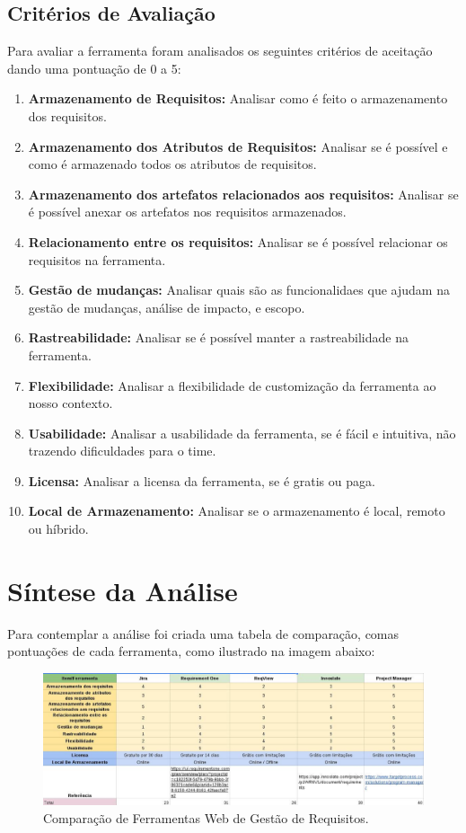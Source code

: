 \subsection{Critérios de Avaliação}
  Para avaliar a ferramenta foram analisados os seguintes critérios de aceitação dando uma pontuação de 0 a 5:
  \begin{enumerate}
    \item \textbf{Armazenamento de Requisitos: } Analisar como é feito o armazenamento dos requisitos.
    \item \textbf{Armazenamento dos Atributos de Requisitos: } Analisar se é possível e como é armazenado todos os atributos de requisitos.
    \item \textbf{Armazenamento dos artefatos relacionados aos requisitos: } Analisar se é possível anexar os artefatos nos requisitos armazenados.
    \item \textbf{Relacionamento entre os requisitos: } Analisar se é possível relacionar os requisitos na ferramenta.
    \item \textbf{Gestão de mudanças: } Analisar quais são as funcionalidaes que ajudam na gestão de mudanças, análise de impacto, e escopo.
    \item \textbf{Rastreabilidade: } Analisar se é possível manter a rastreabilidade na ferramenta.
    \item \textbf{Flexibilidade: } Analisar a flexibilidade de customização da ferramenta ao nosso contexto.
    \item \textbf{Usabilidade: } Analisar a usabilidade da ferramenta, se é fácil e intuitiva, não trazendo dificuldades para o time.
    \item \textbf{Licensa: } Analisar a licensa da ferramenta, se é gratis ou paga.
    \item \textbf{Local de Armazenamento: } Analisar se o armazenamento é local, remoto ou híbrido.

  \end{enumerate}

\section{Síntese da Análise}

  Para contemplar a análise foi criada uma tabela de comparação, comas pontuações de cada ferramenta, como ilustrado na imagem abaixo:

  \begin{figure}[H]
      \centering
    \includegraphics[keepaspectratio=true,scale=0.35]{figuras/ferramenta/ferramentas_web.eps}
      \caption{Comparação de Ferramentas Web de Gestão de Requisitos.}
      \label{fig:progama}
  \end{figure}

